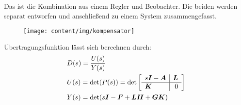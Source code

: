 
\begin{tcolorbox}[colback=white!10!white,colframe=green!30!black,title=Kompensator] 
Das ist die Kombination aus einem Regler und Beobachter. Die beiden werden separat entworfen und anschließend zu einem System zusammengefasst.
\begin{figure}[H]
\centering
\texttt{[image: content/img/kompensator]}
\caption{}
\label{fig:kompensator}
\end{figure}
Übertragungsfunktion lässt sich berechnen durch:
\begin{align*}
	&D(s) = \frac{U(s)}{Y(s)}\\
	&U(s) = \det(P(s)) = \det\left[\begin{array}{l|r}
	s\boldsymbol{I}- \boldsymbol{A} & \boldsymbol{L}\\\hline
	\boldsymbol{K} & 0
	\end{array}\right]\\
	&Y(s) = \det(s\boldsymbol{I}-\boldsymbol{F}+\boldsymbol{LH}+\boldsymbol{GK})
\end{align*} 

\end{tcolorbox}